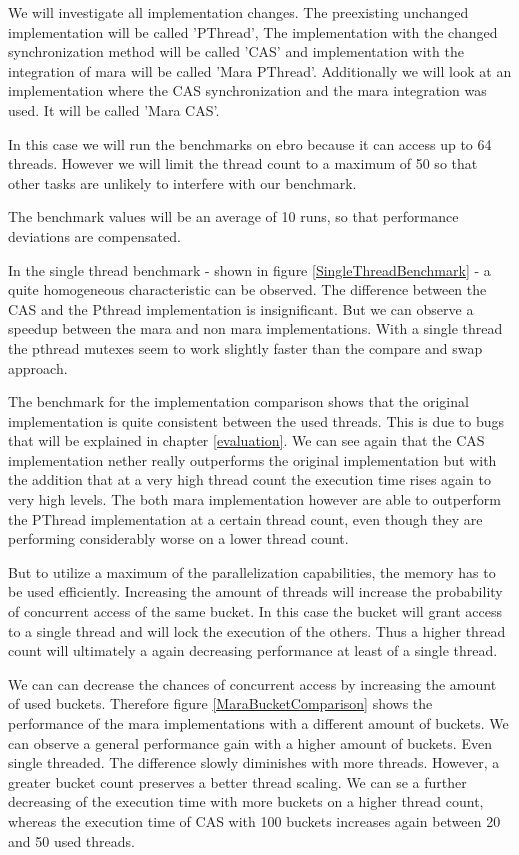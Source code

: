 We will investigate all implementation changes. The preexisting unchanged implementation will be called 'PThread', The implementation with the changed synchronization method will be called 'CAS' and implementation with the integration of mara will be called 'Mara PThread'. Additionally we will look at an implementation where the CAS synchronization and the mara integration was used. It will be called 'Mara CAS'.

In this case we will run the benchmarks on ebro because it can access up to 64 threads. However we will limit the thread count to a maximum of 50 so that other tasks are unlikely to interfere with our benchmark.

The benchmark values will be an average of 10 runs, so that performance deviations are compensated.

In the single thread benchmark - shown in figure \ref{SingleThreadBenchmark} - a quite homogeneous characteristic can be observed. The difference between the CAS and the Pthread implementation is insignificant. But we can observe a speedup between the mara and non mara implementations. With a single thread the pthread mutexes seem to work slightly faster than the compare and swap approach.


The benchmark for the implementation comparison shows that the original implementation is quite consistent between the used threads. This is due to bugs that will be explained in chapter \ref{evaluation}. We can see again that the CAS implementation nether really outperforms the original implementation but with the addition that at a very high thread count the execution time rises again to very high levels. The both mara implementation however are able to outperform the PThread implementation at a certain thread count, even though they are performing considerably worse on a lower thread count.


But to utilize a maximum of the parallelization capabilities, the memory has to be used efficiently. Increasing the amount of threads will increase the probability of concurrent access of the same bucket. In this case the bucket will grant access to a single thread and will lock the execution of the others. Thus a higher thread count will ultimately a again decreasing performance at least of a single thread.

We can can decrease the chances of concurrent access by increasing the amount of used buckets. Therefore figure \ref{MaraBucketComparison} shows the performance of the mara implementations with a different amount of buckets. We can observe a general performance gain with a higher amount of buckets. Even single threaded. The difference slowly diminishes with more threads. However, a greater bucket count preserves a better thread scaling. We can se a further decreasing of the execution time with more buckets on a higher thread count, whereas the execution time of CAS with 100 buckets increases again between 20 and 50 used threads.

